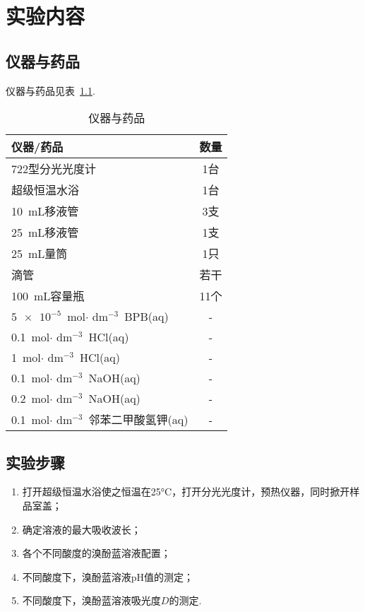 

\chapter{实验内容}

\section{仪器与药品}
仪器与药品见表~\ref{tab1}.
\begin{table}[h]
  \centering
  \caption{仪器与药品}
  \label{tab1}
  \begin{tabular}{lc}
    \toprule
    仪器/药品   & 数量  \\
    \midrule
    722型分光光度计        &  1台   \\
    超级恒温水浴           &   1台     \\
    10~mL移液管              &    3支\\
    25~mL移液管              &    1支\\
    25~mL量筒             &   1只     \\
    滴管                &       若干   \\ 
    100~mL容量瓶            &  11个     \\
    $\num{5e-5}$~mol$\cdot$ dm$^{-3}$~BPB(aq)&-\\
    0.1~mol$\cdot$ dm$^{-3}$~HCl(aq)&-\\
    1~mol$\cdot$ dm$^{-3}$~HCl(aq)&-\\
    0.1~mol$\cdot$ dm$^{-3}$~NaOH(aq)&-\\
    0.2~mol$\cdot$ dm$^{-3}$~NaOH(aq)&-\\
    0.1~mol$\cdot$ dm$^{-3}$~邻苯二甲酸氢钾(aq)&-\\
    \bottomrule
  \end{tabular}
\end{table}

\section{实验步骤}
\begin{enumerate}
  \item 打开超级恒温水浴使之恒温在25\si{\degreeCelsius}，打开分光光度计，预热仪器，同时掀开样品室盖；
  \item 确定溶液的最大吸收波长；
  \item 各个不同酸度的溴酚蓝溶液配置；
  \item 不同酸度下，溴酚蓝溶液pH值的测定；
  \item 不同酸度下，溴酚蓝溶液吸光度$D$的测定.
\end{enumerate}
